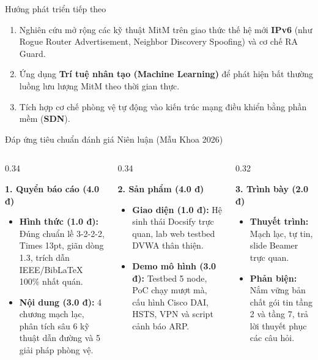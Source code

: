 \documentclass[fleqn]{beamer}
\begin{document}
\begin{frame}{Hướng phát triển tiếp theo}
  \begin{enumerate}
    \item Nghiên cứu mở rộng các kỹ thuật MitM trên giao thức thế hệ mới \textbf{IPv6} (như Rogue Router Advertisement, Neighbor Discovery Spoofing) và cơ chế RA Guard.
    \item Ứng dụng \textbf{Trí tuệ nhân tạo (Machine Learning)} để phát hiện bất thường luồng lưu lượng MitM theo thời gian thực.
    \item Tích hợp cơ chế phòng vệ tự động vào kiến trúc mạng điều khiển bằng phần mềm (\textbf{SDN}).
  \end{enumerate}
\end{frame}

\begin{frame}{Đáp ứng tiêu chuẩn đánh giá Niên luận (Mẫu Khoa 2026)}
  \begin{columns}
    \begin{column}{0.34\textwidth}
      \begin{block}{\textbf{1. Quyển báo cáo (4.0 đ)}}
        \footnotesize
        \begin{itemize}
          \item \textbf{Hình thức (1.0 đ):} Đúng chuẩn lề 3-2-2-2, Times 13pt, giãn dòng 1.3, trích dẫn IEEE/BibLaTeX 100\% nhất quán.
          \item \textbf{Nội dung (3.0 đ):} 4 chương mạch lạc, phân tích sâu 6 kỹ thuật dẫn đường và 5 giải pháp phòng vệ.
        \end{itemize}
      \end{block}
    \end{column}
    \begin{column}{0.34\textwidth}
      \begin{block}{\textbf{2. Sản phẩm (4.0 đ)}}
        \footnotesize
        \begin{itemize}
          \item \textbf{Giao diện (1.0 đ):} Hệ sinh thái Docsify trực quan, lab web testbed DVWA thân thiện.
          \item \textbf{Demo mô hình (3.0 đ):} Testbed 5 node, PoC chạy mượt mà, cấu hình Cisco DAI, HSTS, VPN và script cảnh báo ARP.
        \end{itemize}
      \end{block}
    \end{column}
    \begin{column}{0.32\textwidth}
      \begin{block}{\textbf{3. Trình bày (2.0 đ)}}
        \footnotesize
        \begin{itemize}
          \item \textbf{Thuyết trình:} Mạch lạc, tự tin, slide Beamer trực quan.
          \item \textbf{Phản biện:} Nắm vững bản chất gói tin tầng 2 và tầng 7, trả lời thuyết phục các câu hỏi.
        \end{itemize}
      \end{block}
    \end{column}
  \end{columns}
\end{frame}
\end{document}
